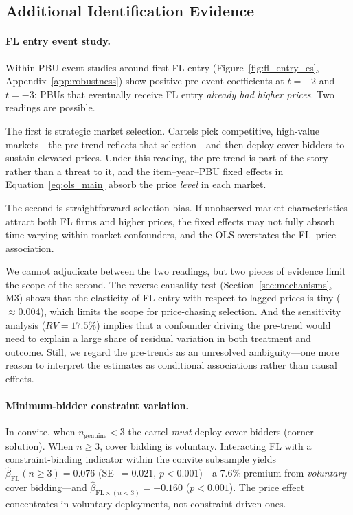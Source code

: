 
\subsection{Additional Identification Evidence}
\label{sec:additional_id}

\paragraph{FL entry event study.}
Within-PBU event studies around first FL entry
(Figure~\ref{fig:fl_entry_es}, Appendix~\ref{app:robustness}) show
positive pre-event coefficients at $t = -2$ and $t = -3$: PBUs that
eventually receive FL entry \emph{already had higher prices}. Two
readings are possible.

The first is strategic market selection. Cartels pick competitive,
high-value markets---the pre-trend reflects that selection---and then
deploy cover bidders to sustain elevated prices. Under this reading,
the pre-trend is part of the story rather than a threat to it, and
the item--year--PBU fixed effects in Equation~\eqref{eq:ols_main}
absorb the price \emph{level} in each market.

The second is straightforward selection bias. If unobserved market
characteristics attract both FL firms and higher prices, the
fixed effects may not fully absorb time-varying within-market
confounders, and the OLS overstates the FL--price association.

We cannot adjudicate between the two readings, but two pieces of
evidence limit the scope of the second. The reverse-causality test
(Section~\ref{sec:mechanisms}, M3) shows that the elasticity of FL
entry with respect to lagged prices is tiny ($\approx 0.004$), which
limits the scope for price-chasing selection. And the sensitivity
analysis ($RV = 17.5\%$) implies that a confounder driving the
pre-trend would need to explain a large share of residual variation in
both treatment and outcome. Still, we regard the pre-trends as an
unresolved ambiguity---one more reason to interpret the estimates as
conditional associations rather than causal effects.

\paragraph{Minimum-bidder constraint variation.}
In convite, when $n_{\text{genuine}} < 3$ the cartel \emph{must}
deploy cover bidders (corner solution). When $n \geq 3$, cover bidding
is voluntary. Interacting FL with a constraint-binding indicator within
the convite subsample yields $\hat{\beta}_{\text{FL}}(n \geq 3) =
0.076$ (SE~$= 0.021$, $p < 0.001$)---a 7.6\% premium from
\emph{voluntary} cover bidding---and $\hat{\beta}_{\text{FL} \times
(n<3)} = -0.160$ ($p < 0.001$). The price effect concentrates in
voluntary deployments, not constraint-driven ones.

